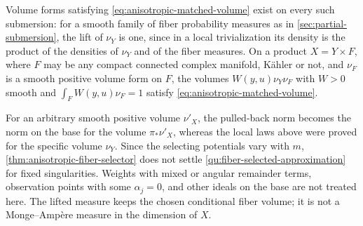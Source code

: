 Volume forms satisfying \eqref{eq:anisotropic-matched-volume} exist on every such submersion: for a smooth family of fiber probability measures as in \cref{sec:partial-submersion}, the lift of $\nu_Y$ is one, since in a local trivialization its density is the product of the densities of $\nu_Y$ and of the fiber measures. On a product $X=Y\times F$, where $F$ may be any compact connected complex manifold, K\"ahler or not, and $\nu_F$ is a smooth positive volume form on $F$, the volumes $W(y,u)\nu_Y\nu_F$ with $W>0$ smooth and $\int_FW(y,u)\nu_F=1$ satisfy \eqref{eq:anisotropic-matched-volume}.

For an arbitrary smooth positive volume $\nu'_X$, the pulled-back norm becomes the norm on the base for the volume $\pi_*\nu'_X$, whereas the local laws above were proved for the specific volume $\nu_Y$. Since the selecting potentials vary with $m$, \cref{thm:anisotropic-fiber-selector} does not settle \cref{qu:fiber-selected-approximation} for fixed singularities. Weights with mixed or angular remainder terms, observation points with some $\alpha_j=0$, and other ideals on the base are not treated here. The lifted measure keeps the chosen conditional fiber volume; it is not a Monge--Amp\`ere measure in the dimension of $X$.
